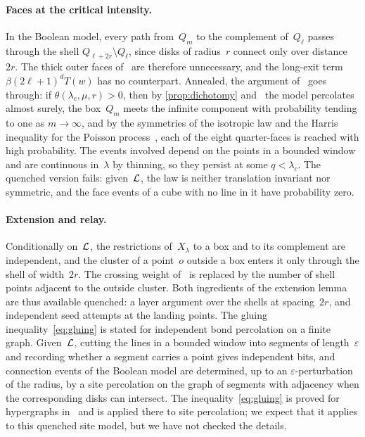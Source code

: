 \documentclass[11pt,letterpaper]{article}
\begin{document}
\paragraph{Faces at the critical intensity.} In the Boolean model, every path from~$Q_m$ to the complement of~$Q_\ell$ passes through the shell $Q_{\ell+2r}\setminus Q_\ell$, since disks of radius~$r$ connect only over distance~$2r$. The thick outer faces of~\cite{Pei26} are therefore unnecessary, and the long-exit term $\beta(2\ell+1)^dT(w)$ has no counterpart. Annealed, the argument of~\cite[Lemma~3.2]{Pei26} goes through: if $\theta(\lambda_c,\mu,r)>0$, then by \cref{prop:dichotomy} and~\cite[Proposition~3.3]{HJ26sub} the model percolates almost surely, the box~$Q_m$ meets the infinite component with probability tending to one as $m\to\infty$, and by the symmetries of the isotropic law and the Harris inequality for the Poisson process~\cite[Theorem~20.4]{LP17}, each of the eight quarter-faces is reached with high probability. The events involved depend on the points in a bounded window and are continuous in~$\lambda$ by thinning, so they persist at some $q<\lambda_c$. The quenched version fails: given~$\mathcal L$, the law is neither translation invariant nor symmetric, and the face events of a cube with no line in it have probability zero.


\paragraph{Extension and relay.} Conditionally on~$\mathcal L$, the restrictions of~$X_\lambda$ to a box and to its complement are independent, and the cluster of a point~$o$ outside a box enters it only through the shell of width~$2r$. The crossing weight of~\cite{Pei26} is replaced by the number of shell points adjacent to the outside cluster. Both ingredients of the extension lemma are thus available quenched: a layer argument over the shells at spacing~$2r$, and independent seed attempts at the landing points. The gluing inequality~\eqref{eq:gluing} is stated for independent bond percolation on a finite graph. Given~$\mathcal L$, cutting the lines in a bounded window into segments of length~$\varepsilon$ and recording whether a segment carries a point gives independent bits, and connection events of the Boolean model are determined, up to an $\varepsilon$-perturbation of the radius, by a site percolation on the graph of segments with adjacency when the corresponding disks can intersect. The inequality~\eqref{eq:gluing} is proved for hypergraphs in~\cite[Proposition~2.1]{OAI26a} and is applied there to site percolation; we expect that it applies to this quenched site model, but we have not checked the details.
\end{document}
